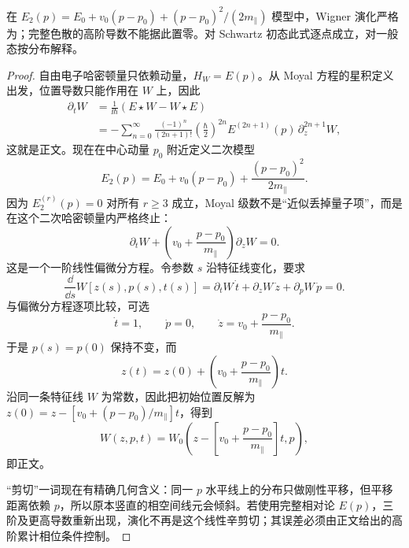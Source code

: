 \begin{proposition}
在 $E_2(p)=E_0+v_0(p-p_0)+(p-p_0)^2/(2m_\parallel)$ 模型中，Wigner 演化严格为；完整色散的高阶导数不能据此置零。对 Schwartz 初态此式逐点成立，对一般态按分布解释。
\end{proposition}
\begin{proof}
自由电子哈密顿量只依赖动量，$H_W=E(p)$。从 Moyal 方程的星积定义出发，位置导数只能作用在 $W$ 上，因此
\begin{align*}
 \partial_tW
 &=\frac{1}{\ii\hbar}(E\star W-W\star E)\\
 &=-\sum_{n=0}^{\infty}
 \frac{(-1)^n}{(2n+1)!}
 \left(\frac{\hbar}{2}\right)^{2n}
 E^{(2n+1)}(p)\,\partial_z^{2n+1}W,
\end{align*}
这就是正文。现在在中心动量 $p_0$ 附近定义二次模型
\begin{equation*}
 E_2(p)=E_0+v_0(p-p_0)+\frac{(p-p_0)^2}{2m_\parallel}.
\end{equation*}
因为 $E_2^{(r)}(p)=0$ 对所有 $r\ge3$ 成立，Moyal 级数不是“近似丢掉量子项”，而是在这个二次哈密顿量内严格终止：
\begin{equation*}
 \partial_tW+
 \left(v_0+\frac{p-p_0}{m_\parallel}\right)\partial_zW=0.
\end{equation*}
这是一个一阶线性偏微分方程。令参数 $s$ 沿特征线变化，要求
\begin{equation*}
 \frac{\dd}{\dd s}W[z(s),p(s),t(s)]
 =\partial_tW\,\dot t+
 \partial_zW\,\dot z+
 \partial_pW\,\dot p=0.
\end{equation*}
与偏微分方程逐项比较，可选
\begin{equation*}
 \dot t=1,
 \qquad
 \dot p=0,
 \qquad
 \dot z=v_0+\frac{p-p_0}{m_\parallel}.
\end{equation*}
于是 $p(s)=p(0)$ 保持不变，而
\begin{equation*}
 z(t)=z(0)+
 \left(v_0+\frac{p-p_0}{m_\parallel}\right)t.
\end{equation*}
沿同一条特征线 $W$ 为常数，因此把初始位置反解为
$z(0)=z-[v_0+(p-p_0)/m_\parallel]t$，得到
\begin{equation*}
 W(z,p,t)=W_0\!\left(
 z-\left[v_0+\frac{p-p_0}{m_\parallel}\right]t,
 p\right),
\end{equation*}
即正文。

“剪切”一词现在有精确几何含义：同一 $p$ 水平线上的分布只做刚性平移，但平移距离依赖 $p$，所以原本竖直的相空间线元会倾斜。若使用完整相对论 $E(p)$，三阶及更高导数重新出现，演化不再是这个线性辛剪切；其误差必须由正文给出的高阶累计相位条件控制。
\end{proof}


